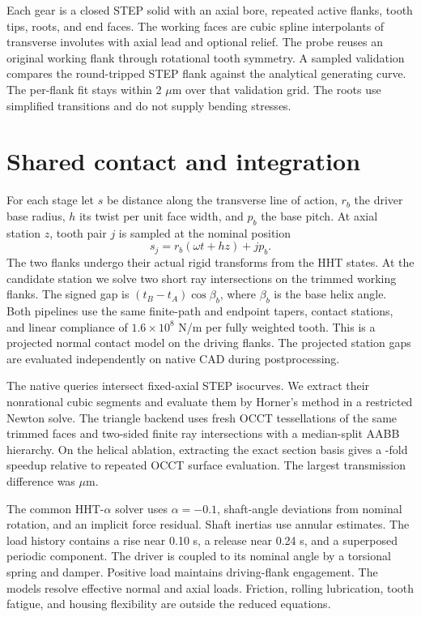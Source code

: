 \documentclass[10pt,a4paper]{article}
\begin{document}
Each gear is a closed STEP solid with an axial bore, repeated active flanks, tooth tips, roots, and end faces. The working faces are cubic spline interpolants of transverse involutes with axial lead and optional relief. The probe reuses an original working flank through rotational tooth symmetry. A sampled validation compares the round-tripped STEP flank against the analytical generating curve. The per-flank fit stays within 2 \(\mu\)m over that validation grid. The roots use simplified transitions and do not supply bending stresses.

\section{Shared contact and integration}

For each stage let \(s\) be distance along the transverse line of action, \(r_b\) the driver base radius, \(h\) its twist per unit face width, and \(p_b\) the base pitch. At axial station \(z\), tooth pair \(j\) is sampled at the nominal position
\begin{equation}
s_j = r_b(\omega t+h z)+j p_b.
\end{equation}
The two flanks undergo their actual rigid transforms from the HHT states. At the candidate station we solve two short ray intersections on the trimmed working flanks. The signed gap is \((t_B-t_A)\cos\beta_b\), where \(\beta_b\) is the base helix angle. Both pipelines use the same finite-path and endpoint tapers, contact stations, and linear compliance of \(1.6\times10^8\) N/m per fully weighted tooth. This is a projected normal contact model on the driving flanks. The projected station gaps are evaluated independently on native CAD during postprocessing.

The native queries intersect fixed-axial STEP isocurves. We extract their nonrational cubic segments and evaluate them by Horner's method in a restricted Newton solve. The triangle backend uses fresh OCCT tessellations of the same trimmed faces and two-sided finite ray intersections with a median-split AABB hierarchy. On the helical ablation, extracting the exact section basis gives a \SectionGain-fold speedup relative to repeated OCCT surface evaluation. The largest transmission difference was \SectionDrift{} \(\mu\)m.

The common HHT-\(\alpha\) solver uses \(\alpha=-0.1\), shaft-angle deviations from nominal rotation, and an implicit force residual. Shaft inertias use annular estimates. The load history contains a rise near 0.10 s, a release near 0.24 s, and a superposed periodic component. The driver is coupled to its nominal angle by a torsional spring and damper. Positive load maintains driving-flank engagement. The models resolve effective normal and axial loads. Friction, rolling lubrication, tooth fatigue, and housing flexibility are outside the reduced equations.
\end{document}
